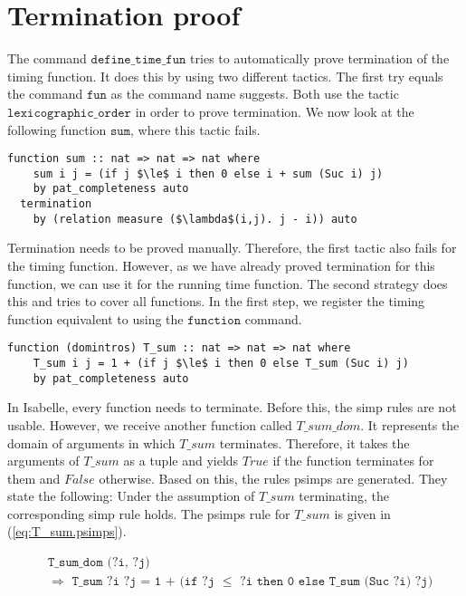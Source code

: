 

\section{Termination proof} \label{chapter:termination}

The command $\texttt{define\_time\_fun}$ tries to automatically prove termination of the timing function.
It does this by using two different tactics.
The first try equals the command $\texttt{fun}$ as the command name suggests.
Both use the tactic $\texttt{lexicographic\_order}$ in order to prove termination.
We now look at the following function $\texttt{sum}$, where this tactic fails.
\begin{lstlisting}[language=isabelle,mathescape=true]
  function sum :: nat => nat => nat where
    sum i j = (if j $\le$ i then 0 else i + sum (Suc i) j)
    by pat_completeness auto
  termination
    by (relation measure ($\lambda$(i,j). j - i)) auto
\end{lstlisting}

Termination needs to be proved manually.
Therefore, the first tactic also fails for the timing function.
However, as we have already proved termination for this function, we can use it for the running time function.
The second strategy does this and tries to cover all functions.
In the first step, we register the timing function equivalent to using the $\texttt{function}$ command.
\begin{lstlisting}[language=isabelle,mathescape=true,caption=Function registration,label=lst:sum_reg]
  function (domintros) T_sum :: nat => nat => nat where
    T_sum i j = 1 + (if j $\le$ i then 0 else T_sum (Suc i) j)
    by pat_completeness auto
\end{lstlisting}
In Isabelle, every function needs to terminate.
Before this, the simp rules are not usable.
However, we receive another function called $T\_sum\_dom$.
It represents the domain of arguments in which $T\_sum$ terminates.
Therefore, it takes the arguments of $T\_sum$ as a tuple and yields $True$ if the function terminates for them and $False$ otherwise.
Based on this, the rules psimps are generated.
They state the following: Under the assumption of $T\_sum$ terminating, the corresponding simp rule holds.
The psimps rule for $T\_sum$ is given in (\ref{eq:T_sum.psimps}).

\begin{equation}
  \begin{aligned}
  &\texttt{T\_sum\_dom (?i, ?j)}\\
  &\texttt{$\Longrightarrow$ T\_sum ?i ?j = 1 + (if ?j $\le$ ?i then 0 else T\_sum (Suc ?i) ?j)}
  \end{aligned}
  \label{eq:T_sum.psimps}
\end{equation}

